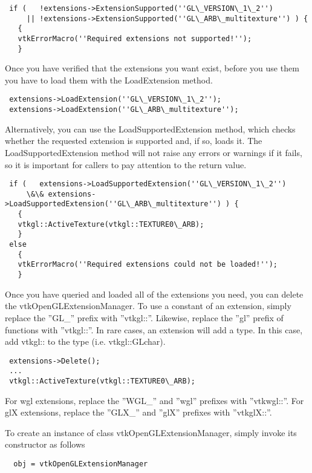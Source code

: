  \begin{verbatim}
 if (   !extensions->ExtensionSupported(''GL\_VERSION\_1\_2'')
     || !extensions->ExtensionSupported(''GL\_ARB\_multitexture'') ) {
   {
   vtkErrorMacro(''Required extensions not supported!'');
   }
 \end{verbatim}

 Once you have verified that the extensions you want exist, before you
 use them you have to load them with the LoadExtension method.

 \begin{verbatim}
 extensions->LoadExtension(''GL\_VERSION\_1\_2'');
 extensions->LoadExtension(''GL\_ARB\_multitexture'');
 \end{verbatim}

 Alternatively, you can use the LoadSupportedExtension method, which checks
 whether the requested extension is supported and, if so, loads it. The
 LoadSupportedExtension method will not raise any errors or warnings if it
 fails, so it is important for callers to pay attention to the return value.

 \begin{verbatim}
 if (   extensions->LoadSupportedExtension(''GL\_VERSION\_1\_2'')
     \&\& extensions->LoadSupportedExtension(''GL\_ARB\_multitexture'') ) {
   {
   vtkgl::ActiveTexture(vtkgl::TEXTURE0\_ARB);
   }
 else
   {
   vtkErrorMacro(''Required extensions could not be loaded!'');
   }
 \end{verbatim}

 Once you have queried and loaded all of the extensions you need, you can
 delete the vtkOpenGLExtensionManager.  To use a constant of an extension,
 simply replace the ''GL\_'' prefix with ''vtkgl::''.  Likewise, replace the
 ''gl'' prefix of functions with ''vtkgl::''.  In rare cases, an extension will
 add a type. In this case, add vtkgl:: to the type (i.e. vtkgl::GLchar).

 \begin{verbatim}
 extensions->Delete();
 ...
 vtkgl::ActiveTexture(vtkgl::TEXTURE0\_ARB);
 \end{verbatim}

 For wgl extensions, replace the ''WGL\_'' and ''wgl'' prefixes with
 ''vtkwgl::''.  For glX extensions, replace the ''GLX\_'' and ''glX'' prefixes
 with ''vtkglX::''.


To create an instance of class vtkOpenGLExtensionManager, simply
invoke its constructor as follows
\begin{verbatim}
  obj = vtkOpenGLExtensionManager
\end{verbatim}
